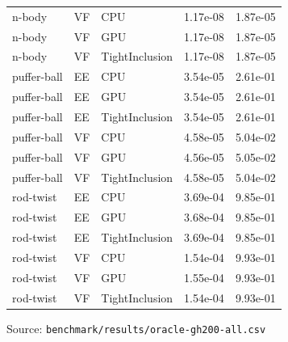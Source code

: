 \begin{table}[htbp]
{\begin{tabular}{lllrr}
    n-body & VF & CPU & 1.17e-08 & 1.87e-05 \\
    n-body & VF & GPU & 1.17e-08 & 1.87e-05 \\
    n-body & VF & TightInclusion & 1.17e-08 & 1.87e-05 \\
    puffer-ball & EE & CPU & 3.54e-05 & 2.61e-01 \\
    puffer-ball & EE & GPU & 3.54e-05 & 2.61e-01 \\
    puffer-ball & EE & TightInclusion & 3.54e-05 & 2.61e-01 \\
    puffer-ball & VF & CPU & 4.58e-05 & 5.04e-02 \\
    puffer-ball & VF & GPU & 4.56e-05 & 5.05e-02 \\
    puffer-ball & VF & TightInclusion & 4.58e-05 & 5.04e-02 \\
    rod-twist & EE & CPU & 3.69e-04 & 9.85e-01 \\
    rod-twist & EE & GPU & 3.68e-04 & 9.85e-01 \\
    rod-twist & EE & TightInclusion & 3.69e-04 & 9.85e-01 \\
    rod-twist & VF & CPU & 1.54e-04 & 9.93e-01 \\
    rod-twist & VF & GPU & 1.55e-04 & 9.93e-01 \\
    rod-twist & VF & TightInclusion & 1.54e-04 & 9.93e-01 \\
    \bottomrule
  \end{tabular}}
  \par\smallskip\footnotesize Source: \texttt{benchmark/results/oracle-gh200-all.csv}
\end{table}
